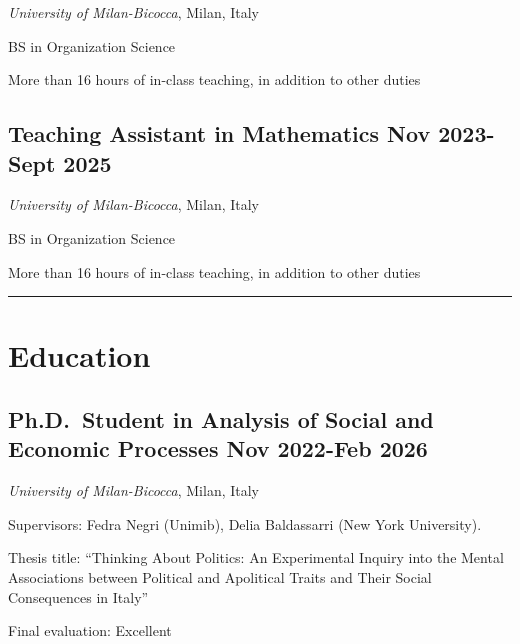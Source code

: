 \documentclass[10pt,]{article}
\providecommand{\tightlist}{%
  \setlength{\itemsep}{0pt}\setlength{\parskip}{0pt}}
\renewenvironment{itemize}{
  \begin{list}{}{
    \setlength{\leftmargin}{1.5em}
  }
}{
  \end{list}
}
\begin{document}
\begin{itemize}
\tightlist
\item
  \emph{University of Milan-Bicocca}, Milan, Italy
\item
  BS in Organization Science
\item
  More than 16 hours of in-class teaching, in addition to other duties
\end{itemize}

\subsection{\texorpdfstring{Teaching Assistant in Mathematics \hfill Nov
2023-Sept
2025}{Teaching Assistant in Mathematics Nov 2023-Sept 2025}}\label{teaching-assistant-in-mathematics-nov-2023-sept-2025}

\begin{itemize}
\tightlist
\item
  \emph{University of Milan-Bicocca}, Milan, Italy
\item
  BS in Organization Science
\item
  More than 16 hours of in-class teaching, in addition to other duties
\end{itemize}

\bigskip \hrule

\section{\texorpdfstring{\textbf{Education}}{Education}}\label{education}

\subsection{\texorpdfstring{Ph.D.~Student in Analysis of Social and
Economic Processes \hfill Nov 2022-Feb
2026}{Ph.D.~Student in Analysis of Social and Economic Processes Nov 2022-Feb 2026}}\label{ph.d.-student-in-analysis-of-social-and-economic-processes-nov-2022-feb-2026}

\emph{University of Milan-Bicocca}, Milan, Italy

\begin{itemize}
\tightlist
\item
  Supervisors: Fedra Negri (Unimib), Delia Baldassarri (New York
  University).
\item
  Thesis title: ``Thinking About Politics: An Experimental Inquiry into
  the Mental Associations between Political and Apolitical Traits and
  Their Social Consequences in Italy''
\item
  Final evaluation: Excellent
\end{itemize}
\end{document}
